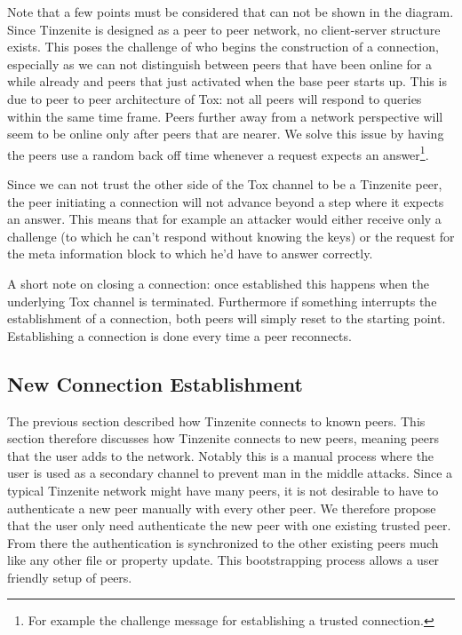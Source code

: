 Note that a few points must be considered that can not be shown in the diagram.
Since Tinzenite is designed as a peer to peer network, no client-server structure exists.
This poses the challenge of who begins the construction of a connection, especially as we can not distinguish between peers that have been online for a while already and peers that just activated when the base peer starts up.
This is due to peer to peer architecture of Tox: not all peers will respond to queries within the same time frame.
Peers further away from a network perspective will seem to be online only after peers that are nearer.
We solve this issue by having the peers use a random back off time whenever a request expects an answer\footnote{For example the challenge message for establishing a trusted connection.}.

Since we can not trust the other side of the Tox channel to be a Tinzenite peer, the peer initiating a connection will not advance beyond a step where it expects an answer.
This means that for example an attacker would either receive only a challenge (to which he can't respond without knowing the keys) or the request for the meta information block to which he'd have to answer correctly.

A short note on closing a connection: once established this happens when the underlying Tox channel is terminated.
Furthermore if something interrupts the establishment of a connection, both peers will simply reset to the starting point.
Establishing a connection is done every time a peer reconnects.

\subsection{New Connection Establishment}
\label{sub:New Connection Establishment}

The previous section described how Tinzenite connects to known peers.
This section therefore discusses how Tinzenite connects to new peers, meaning peers that the user adds to the network.
Notably this is a manual process where the user is used as a secondary channel to prevent man in the middle attacks.
Since a typical Tinzenite network might have many peers, it is not desirable to have to authenticate a new peer manually with every other peer.
We therefore propose that the user only need authenticate the new peer with one existing trusted peer.
From there the authentication is synchronized to the other existing peers much like any other file or property update.
This bootstrapping process allows a user friendly setup of peers.


